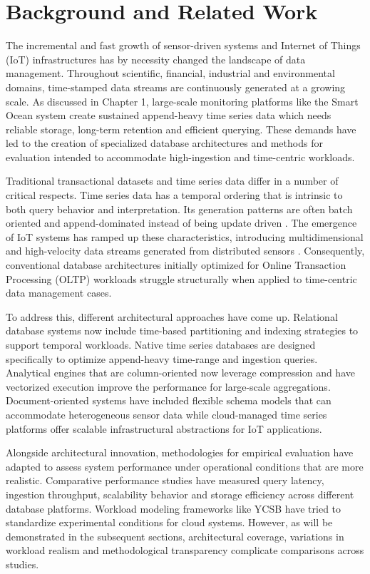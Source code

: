 \chapter{Background and Related Work}\label{chap:background}
The incremental and fast growth of sensor-driven systems and Internet of Things (IoT) infrastructures \cite{computers_2025} has by necessity changed the landscape of data management. Throughout scientific, financial, industrial and environmental domains, time-stamped data streams are continuously generated at a growing scale. As discussed in Chapter 1, large-scale monitoring platforms like the Smart Ocean system create sustained append-heavy time series data which needs reliable storage, long-term retention and efficient querying. These demands have led to the creation of specialized database architectures and methods for evaluation intended to accommodate high-ingestion and time-centric workloads.



Traditional transactional datasets and time series data differ in a number of critical respects. Time series data has a temporal ordering that is intrinsic to both query behavior and interpretation. Its generation patterns are often batch oriented and append-dominated instead of being update driven \cite{Grzesik2020}. The emergence of IoT systems has ramped up these characteristics, introducing multidimensional and high-velocity data streams generated from distributed sensors \cite{Juan_2017}. Consequently, conventional database architectures initially optimized for Online Transaction Processing (OLTP) workloads struggle structurally when applied to time-centric data management cases. 


To address this, different architectural approaches have come up. Relational database systems now include time-based partitioning and indexing strategies to support temporal workloads. Native time series databases are designed specifically to optimize append-heavy time-range and ingestion queries. Analytical engines that are column-oriented now leverage compression and have vectorized execution improve the performance for large-scale aggregations. Document-oriented systems have included flexible schema models that can accommodate heterogeneous sensor data while cloud-managed time series platforms offer scalable infrastructural abstractions for IoT applications. 

Alongside architectural innovation, methodologies for empirical evaluation have adapted to assess system performance under operational conditions that are more realistic. Comparative performance studies have measured query latency, ingestion throughput, scalability behavior and storage efficiency across different database platforms. Workload modeling frameworks like YCSB \cite{Cooper_2010} have tried to standardize experimental conditions for cloud systems. However, as will be demonstrated in the subsequent sections, architectural coverage, variations in workload realism and methodological transparency complicate comparisons across studies. 


